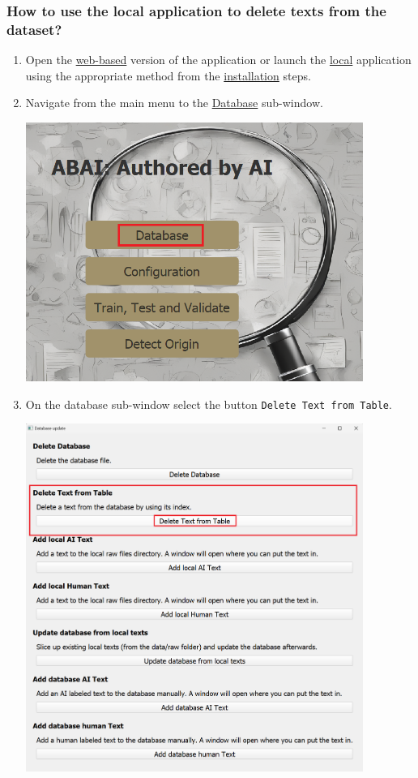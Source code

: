 \subsubsection{How to use the local application to delete texts from the dataset?}
\begin{enumerate}
    \item Open the \hyperref[subsubsec:Web application]{web-based} version of the application or launch the \hyperref[subsubsec:Local application]{local} application using the appropriate method from the \hyperref[subsec:First steps]{installation} steps.
    \item Navigate from the main menu to the \hyperref[subsubsec:database]{Database} sub-window.
    \begin{center}
        \includegraphics[width=11cm]{Images/Usage/Demo/navigate-database.png}
    \end{center}
    \item On the database sub-window select the button \texttt{Delete Text from Table}.
    \begin{center}
        \includegraphics[width=11cm]{Images/Usage/Demo/delete.png}

\end{center}
\end{enumerate}
